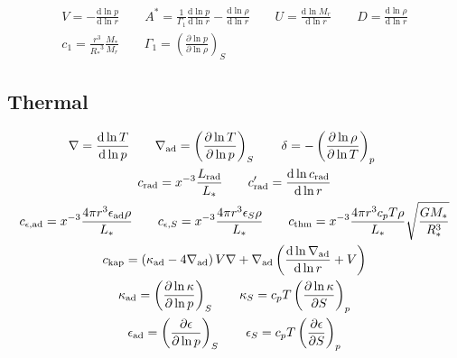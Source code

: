 \documentclass[fleqn]{article}
\newcommand{\diff}{\ensuremath{\mathrm{d}}}
\newcommand{\As}{\ensuremath{A^{\ast}}}
\newcommand{\nabad}{\ensuremath{\nabla_{\rm ad}}}
\newcommand{\kapad}{\ensuremath{\kappa_{\rm ad}}}
\newcommand{\kapS}{\ensuremath{\kappa_{S}}}
\newcommand{\epsad}{\ensuremath{\epsilon_{\rm ad}}}
\newcommand{\epsS}{\ensuremath{\epsilon_{S}}}
\newcommand{\crad}{\ensuremath{c_{\rm rad}}}
\newcommand{\cepsad}{\ensuremath{c_{\epsilon,{\rm ad}}}}
\newcommand{\cepsS}{\ensuremath{c_{\epsilon,S}}}
\newcommand{\cthm}{\ensuremath{c_{\rm thm}}}
\newcommand{\ckap}{\ensuremath{c_{\rm kap}}}
\newcommand{\Rstar}{\ensuremath{R_{\ast}}}
\newcommand{\Mstar}{\ensuremath{M_{\ast}}}
\newcommand{\Lrad}{\ensuremath{L_{\rm rad}}}
\newcommand{\Lstar}{\ensuremath{L_{\ast}}}
\begin{document}
\begin{gather*}
V = -\frac{\diff \ln p}{\diff \ln r} \qquad
\As = \frac{1}{\Gamma_{1}} \frac{\diff \ln p}{\diff \ln r} - \frac{\diff \ln \rho}{\diff \ln r} \qquad
U = \frac{\diff \ln M_{r}}{\diff \ln r} \qquad
D = \frac{\diff \ln \rho}{\diff \ln r} \\
c_1 = \frac{r^{3}}{\Rstar^{3}} \frac{\Mstar}{M_{r}} \qquad
\Gamma_{1} = \left( \frac{\partial \ln p}{\partial \ln \rho} \right)_{S}
\end{gather*}

\subsection*{Thermal}

\begin{gather*}
\nabla = \frac{\diff \ln T}{\diff \ln p} \qquad
\nabad = \left( \frac{\partial \ln T}{\partial \ln p} \right)_{S} \qquad
\delta = - \left( \frac{\partial \ln \rho}{\partial \ln T} \right)_{p} \qquad \\
\crad = x^{-3} \frac{\Lrad}{\Lstar} \qquad
\crad' = \frac{\diff \ln \crad}{\diff \ln r} \\
\cepsad = x^{-3} \frac{4\pi r^{3} \epsad \rho}{\Lstar} \qquad
\cepsS = x^{-3} \frac{4\pi r^{3} \epsS \rho}{\Lstar} \qquad
\cthm = x^{-3} \frac{4\pi r^{3} c_{p} T \rho}{\Lstar} \sqrt{\frac{G\Mstar}{\Rstar^{3}}} \\
\ckap = \left( \kapad - 4 \nabad \right) V \nabla + \nabad \left( \frac{\diff \ln \nabad}{\diff \ln r} + V \right) \\
\kapad = \left( \frac{\partial \ln \kappa}{\partial \ln p} \right)_{S} \qquad
\kapS = c_{p} T \left( \frac{\partial \ln \kappa}{\partial S} \right)_{p} \\
\epsad = \left( \frac{\partial \epsilon}{\partial \ln p} \right)_{S} \qquad
\epsS = c_{p} T \left( \frac{\partial \epsilon}{\partial S} \right)_{p}
\end{gather*}
\end{document}
